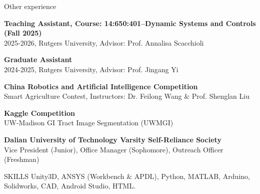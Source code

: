 \documentclass{resume} %
\begin{document}
\begin{rSection}{Other experience}

\begin{rSubsection}{}{}
	{}{}

\item {{\bf Teaching Assistant, Course: 14:650:401–Dynamic Systems and Controls (Fall 2025)}\\ 2025-2026, Rutgers University, Advisor: Prof. Annalisa Scacchioli}\\

\item {{\bf Graduate Assistant}\\ 2024-2025, Rutgers University, Advisor: Prof. Jingang Yi}\\

\item {{\bf China Robotics and Artificial Intelligence Competition}\\ Smart Agriculture Contest, Instructors: Dr. Feilong Wang \& Prof. Shenglan Liu}\\

\item {{\bf Kaggle Competition}\\UW-Madison GI Tract Image Segmentation (UWMGI)}\\

\item {{\bf Dalian University of Technology Varsity Self-Reliance Society}\\Vice President (Junior), Office Manager (Sophomore), Outreach Officer (Freshman)}\\
\end{rSubsection}

\end{rSection}

\begin{rSection}{SKILLS}
	Unity3D, ANSYS (Workbench $\&$ APDL), Python, MATLAB, Arduino, Solidworks, CAD, Android Studio, HTML.  \\
\end{rSection}

\vspace{-1em}
\end{document}
